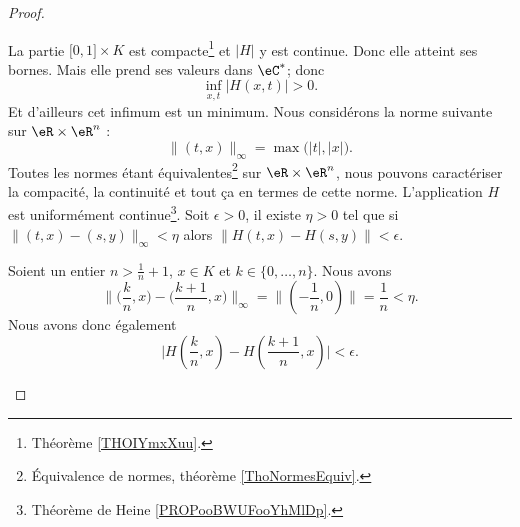 \begin{proof}
\begin{subproof}
        La partie \( \mathopen[ 0 , 1 \mathclose]\times K\) est compacte\footnote{Théorème \ref{THOIYmxXuu}.} et \( | H |\) y est continue. Donc elle atteint ses bornes. Mais elle prend ses valeurs dans \( \eC^*\); donc
        \begin{equation}
            \inf_{x,t}| H(x,t) |>0.
        \end{equation}
        Et d'ailleurs cet infimum est un minimum. Nous considérons la norme suivante sur \( \eR\times \eR^n\) :
        \begin{equation}
            \| (t,x) \|_{\infty}=\max\big( | t |,| x | \big).
        \end{equation}
        Toutes les normes étant équivalentes\footnote{Équivalence de normes, théorème \ref{ThoNormesEquiv}.} sur \( \eR\times \eR^n\), nous pouvons caractériser la compacité, la continuité et tout ça en termes de cette norme. L'application \( H\) est uniformément continue\footnote{Théorème de Heine \ref{PROPooBWUFooYhMlDp}.}. Soit \( \epsilon>0\), il existe \( \eta>0\) tel que si \( \| (t,x)-(s,y) \|_{\infty}<\eta\) alors \( \| H(t,x)-H(s,y) \|<\epsilon\).

        Soient un entier \( n>\frac{1}{ n }+1\), \( x\in K\)  et \( k\in\{ 0,\ldots, n \}\). Nous avons
        \begin{equation}
            \big\| \big(\frac{ k }{ n },x\big)-\big(  \frac{ k+1 }{ n },x \big) \big\|_{\infty}=\big\|  (-\frac{1}{ n },0)  \big\|=\frac{1}{ n }<\eta.
        \end{equation}
        Nous avons donc également
        \begin{equation}
            \big| H(\frac{ k }{ n },x)-H(\frac{ k+1 }{ n },x) \big|<\epsilon.
        \end{equation}
        

\end{subproof}
\end{proof}
